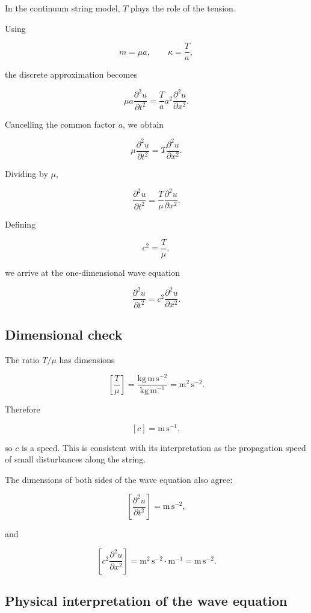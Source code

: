 In the continuum string model, \(T\) plays the role of the tension.

Using

\[
m=\mu a,
\qquad
\kappa=\frac{T}{a},
\]

the discrete approximation becomes

\[
\mu a
\frac{\partial^{2}u}{\partial t^{2}}
=
\frac{T}{a}a^{2}
\frac{\partial^{2}u}{\partial x^{2}}.
\]

Cancelling the common factor \(a\), we obtain

\[
\boxed{
\mu
\frac{\partial^{2}u}{\partial t^{2}}
=
T
\frac{\partial^{2}u}{\partial x^{2}}
}.
\]

Dividing by \(\mu\),

\[
\frac{\partial^{2}u}{\partial t^{2}}
=
\frac{T}{\mu}
\frac{\partial^{2}u}{\partial x^{2}}.
\]

Defining

\[
c^{2}=\frac{T}{\mu},
\]

we arrive at the one-dimensional wave equation

\[
\boxed{
\frac{\partial^{2}u}{\partial t^{2}}
=
c^{2}
\frac{\partial^{2}u}{\partial x^{2}}
}.
\]

\subsection{Dimensional check}

The ratio \(T/\mu\) has dimensions

\[
\left[\frac{T}{\mu}\right]
=
\frac{\mathrm{kg\,m\,s^{-2}}}{\mathrm{kg\,m^{-1}}}
=
\mathrm{m^{2}\,s^{-2}}.
\]

Therefore

\[
[c]=\mathrm{m\,s^{-1}},
\]

so \(c\) is a speed. This is consistent with its interpretation as the propagation speed of small disturbances along the string.

The dimensions of both sides of the wave equation also agree:

\[
\left[
\frac{\partial^{2}u}{\partial t^{2}}
\right]
=
\mathrm{m\,s^{-2}},
\]

and

\[
\left[
c^{2}
\frac{\partial^{2}u}{\partial x^{2}}
\right]
=
\mathrm{m^{2}\,s^{-2}}
\cdot
\mathrm{m^{-1}}
=
\mathrm{m\,s^{-2}}.
\]

\subsection{Physical interpretation of the wave equation}

